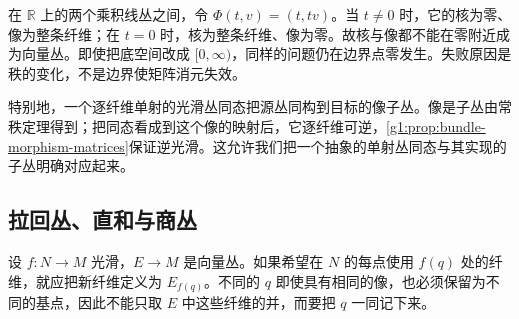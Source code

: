 \begin{example}
	\label{g1:exm:variable-rank-bundle-map}
	在 \(\mathbb R\) 上的两个乘积线丛之间，令 \(\Phi(t,v)=(t,tv)\)。当 \(t\ne0\) 时，它的核为零、像为整条纤维；在 \(t=0\) 时，核为整条纤维、像为零。故核与像都不能在零附近成为向量丛。即使把底空间改成 \([0,\infty)\)，同样的问题仍在边界点零发生。失败原因是秩的变化，不是边界使矩阵消元失效。
\end{example}

特别地，一个逐纤维单射的光滑丛同态把源丛同构到目标的像子丛。像是子丛由常秩定理得到；把同态看成到这个像的映射后，它逐纤维可逆，\cref{g1:prop:bundle-morphism-matrices}保证逆光滑。这允许我们把一个抽象的单射丛同态与其实现的子丛明确对应起来。
\subsection{拉回丛、直和与商丛}
\label{g1:subsec:1201:03}

设 \(f:N\to M\) 光滑，\(E\to M\) 是向量丛。如果希望在 \(N\) 的每点使用 \(f(q)\) 处的纤维，就应把新纤维定义为 \(E_{f(q)}\)。不同的 \(q\) 即使具有相同的像，也必须保留为不同的基点，因此不能只取 \(E\) 中这些纤维的并，而要把 \(q\) 一同记下来。

